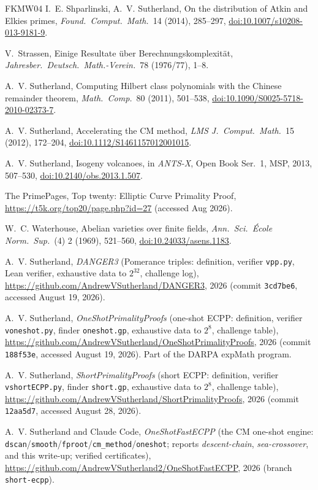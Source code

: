 \documentclass[11pt]{amsart}
\theoremstyle{plain}
\theoremstyle{definition}
\theoremstyle{remark}
\begin{document}
\begin{thebibliography}{FKMW04}
 I.~E. Shparlinski, A.~V. Sutherland, On the distribution of Atkin and Elkies
primes, \emph{Found.\ Comput.\ Math.}\ 14 (2014), 285--297, \href{https://doi.org/10.1007/s10208-013-9181-9}{doi:10.1007/s10208-013-9181-9}.

 V.~Strassen, Einige Resultate \"uber Berechnungskomplexit\"at,
\emph{Jahresber.\ Deutsch.\ Math.-Verein.}\ 78 (1976/77), 1--8.

 A.~V. Sutherland, Computing Hilbert class polynomials with the Chinese
remainder theorem, \emph{Math.\ Comp.}\ 80 (2011), 501--538, \href{https://doi.org/10.1090/S0025-5718-2010-02373-7}{doi:10.1090/S0025-5718-2010-02373-7}.

 A.~V. Sutherland, Accelerating the CM method, \emph{LMS J.~Comput.\ Math.}\ 15
(2012), 172--204, \href{https://doi.org/10.1112/S1461157012001015}{doi:10.1112/S1461157012001015}.

 A.~V. Sutherland, Isogeny volcanoes, in \emph{ANTS-X}, Open Book Ser.\ 1, MSP,
2013, 507--530, \href{https://doi.org/10.2140/obs.2013.1.507}{doi:10.2140/obs.2013.1.507}.

 The PrimePages, Top twenty: Elliptic Curve Primality Proof,
\url{https://t5k.org/top20/page.php?id=27} (accessed Aug 2026).

 W.~C. Waterhouse, Abelian varieties over finite fields, \emph{Ann.\ Sci.\
\'Ecole Norm.\ Sup.}\ (4) 2 (1969), 521--560, \href{https://doi.org/10.24033/asens.1183}{doi:10.24033/asens.1183}.

 A.~V. Sutherland, \emph{DANGER3} (Pomerance triples: definition, verifier
\texttt{vpp.py}, Lean verifier, exhaustive data to $2^{32}$, challenge log),
\url{https://github.com/AndrewVSutherland/DANGER3}, 2026 (commit \texttt{3cd7be6}, accessed
August 19, 2026).

 A.~V. Sutherland, \emph{OneShotPrimalityProofs} (one-shot ECPP: definition,
verifier \texttt{voneshot.py}, finder \texttt{oneshot.gp}, exhaustive data to $2^8$, challenge table),
\url{https://github.com/AndrewVSutherland/OneShotPrimalityProofs}, 2026 (commit \texttt{188f53e},
accessed August 19, 2026).  Part of the DARPA expMath program.

 A.~V. Sutherland, \emph{ShortPrimalityProofs} (short ECPP: definition, verifier
\texttt{vshortECPP.py}, finder \texttt{short.gp}, exhaustive data to
$2^8$, challenge table), \url{https://github.com/AndrewVSutherland/ShortPrimalityProofs}, 2026
(commit \texttt{12aa5d7}, accessed August 28, 2026).

 A.~V. Sutherland and Claude Code, \emph{OneShotFastECPP} (the CM one-shot
engine: \texttt{dscan}/\texttt{smooth}/\texttt{fproot}/\texttt{cm\_method}/\texttt{oneshot}; reports
\emph{descent-chain}, \emph{sea-crossover}, and this write-up; verified certificates),
\url{https://github.com/AndrewVSutherland2/OneShotFastECPP}, 2026 (branch \texttt{short-ecpp}).

\end{thebibliography}
\end{document}

